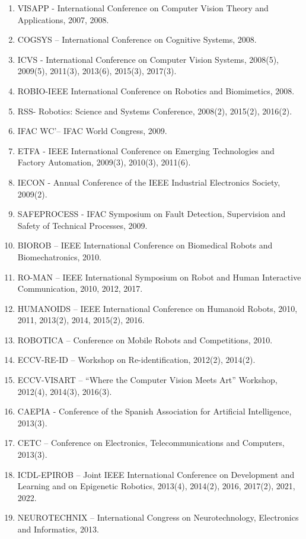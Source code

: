 \documentclass[
]{article}
\begin{document}
\begin{enumerate}
  2007.
\item
  VISAPP - International Conference on Computer Vision Theory and
  Applications, 2007, 2008.
\item
  COGSYS -- International Conference on Cognitive Systems, 2008.
\item
  ICVS - International Conference on Computer Vision Systems, 2008(5),
  2009(5), 2011(3), 2013(6), 2015(3), 2017(3).
\item
  ROBIO-IEEE International Conference on Robotics and Biomimetics, 2008.
\item
  RSS- Robotics: Science and Systems Conference, 2008(2), 2015(2),
  2016(2).
\item
  IFAC WC'-- IFAC World Congress, 2009.
\item
  ETFA - IEEE International Conference on Emerging Technologies and
  Factory Automation, 2009(3), 2010(3), 2011(6).
\item
  IECON - Annual Conference of the IEEE Industrial Electronics Society,
  2009(2).
\item
  SAFEPROCESS - IFAC Symposium on Fault Detection, Supervision and
  Safety of Technical Processes, 2009.
\item
  BIOROB -- IEEE International Conference on Biomedical Robots and
  Biomechatronics, 2010.
\item
  RO-MAN -- IEEE International Symposium on Robot and Human Interactive
  Communication, 2010, 2012, 2017.
\item
  HUMANOIDS -- IEEE International Conference on Humanoid Robots, 2010,
  2011, 2013(2), 2014, 2015(2), 2016.
\item
  ROBOTICA -- Conference on Mobile Robots and Competitions, 2010.
\item
  ECCV-RE-ID -- Workshop on Re-identification, 2012(2), 2014(2).
\item
  ECCV-VISART -- ``Where the Computer Vision Meets Art'' Workshop,
  2012(4), 2014(3), 2016(3).
\item
  CAEPIA - Conference of the Spanish Association for Artificial
  Intelligence, 2013(3).
\item
  CETC -- Conference on Electronics, Telecommunications and Computers,
  2013(3).
\item
  ICDL-EPIROB -- Joint IEEE International Conference on Development and
  Learning and on Epigenetic Robotics, 2013(4), 2014(2), 2016, 2017(2),
  2021, 2022.
\item
  NEUROTECHNIX -- International Congress on Neurotechnology, Electronics
  and Informatics, 2013.

\end{enumerate}
\end{document}
